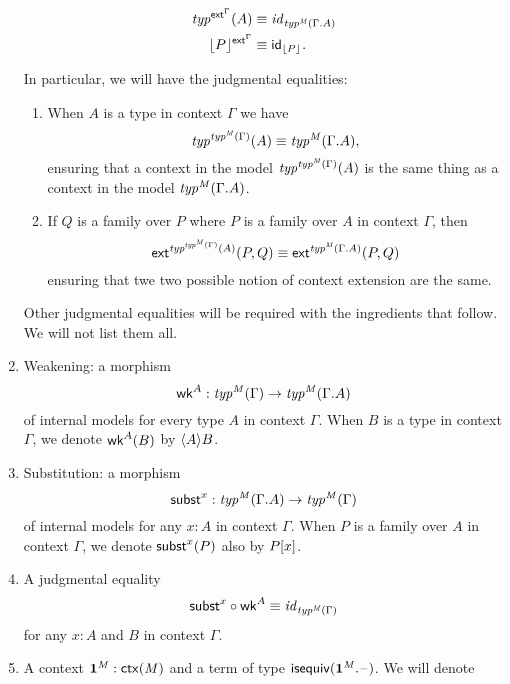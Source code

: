 \begin{defn}
\begin{enumerate}
\begin{align*}
\mftyp{\tfext^\Gamma}{A} & \jdeq \modelfont{id}_{\mftyp{\mfM}{\ctxext{\Gamma}{A}}}\\
\terms[{\tfext^\Gamma}]{P} & \jdeq \idfunc[\terms{P}].
\end{align*}
\begin{rmk}
In particular, we will have the judgmental equalities:
\begin{enumerate}
\item When $A$ is a type in context $\Gamma$ we have
\begin{equation*}
\mftyp{\mftyp{\mfM}{\Gamma}}{A}\jdeq\mftyp{\mfM}{\ctxext{\Gamma}{A}},
\end{equation*}
ensuring that a context in the model ${{\mathit{typ}^{{{\mathit{typ}^{\mathit{M}}}(\Gamma)}}}(A)}$ is the same thing as a
context in the model $\mftyp{\mfM}{\ctxext{\Gamma}{A}}$.
\item If $Q$ is a family over $P$ where $P$ is a family over $A$ in context $\Gamma$, then
\begin{equation*}
\tfext^{\protect{\mftyp{\mftyp{\mfM}{\Gamma}}{A}}}(P,Q)
\jdeq
\tfext^{\protect{\mftyp{\mfM}{\ctxext{\Gamma}{A}}}}(P,Q)
\end{equation*}
ensuring that twe two possible notion of context extension are the same.
\end{enumerate}
Other judgmental equalities will be required with the ingredients that follow.
We will not list them all.
\end{rmk}
\item Weakening: a morphism
\begin{equation*}
\tfwk^A:\mftyp{\mfM}{\Gamma}\to\mftyp{\mfM}{\ctxext{\Gamma}{A}}
\end{equation*}
of internal models for every type $A$ in context $\Gamma$. When $B$ is a type
in context $\Gamma$, we denote $\mathsf{wk}^A(B)$ by $\ctxwk{A}{B}$. 
\item Substitution: a morphism
\begin{equation*}
\tfsubst^x:\mftyp{\mfM}{\ctxext{\Gamma}{A}}\to\mftyp{\mfM}{\Gamma}
\end{equation*}
of internal models for any $x:A$ in context $\Gamma$. When $P$ is a family over $A$ in context
$\Gamma$, we denote $\mathsf{subst}^x(P)$ also by $\subst{x}{P}$. 
\item A judgmental equality
\begin{equation*}
\mathsf{subst}^x\circ\mathsf{wk}^A\equiv\mathit{id}_{{{\mathit{typ}^{\mathit{M}}}(\Gamma)}}
\end{equation*}
for any $x:A$ and $B$ in context $\Gamma$.
\item A context $\mathbf{1}^\mathit{M}:\mathsf{ctx}(\mathit{M})$ and a term of type $\isequiv(\ctxext{\unit^\mfM}{\blank})$. We will denote

\end{enumerate}
\end{defn}
